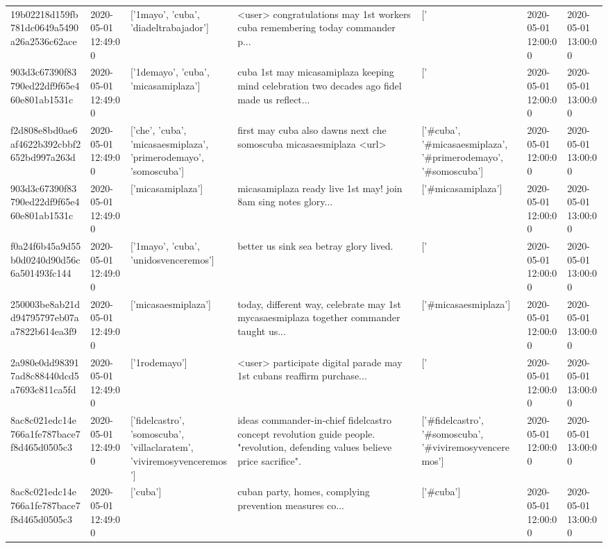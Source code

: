 \begin{tabular}{lllllll}
19b02218d159fb781dc0649a5490a26a2536c62ace & 2020-05-01 12:49:00 & ['1mayo', 'cuba', 'diadeltrabajador'] & <user> congratulations may 1st workers cuba remembering today commander p... & ['#1mayo', '#cuba', '#diadeltrabajador'] & 2020-05-01 12:00:00 & 2020-05-01 13:00:00 \\
903d3c67390f83790ed22df9f65e460e801ab1531c & 2020-05-01 12:49:00 & ['1demayo', 'cuba', 'micasamiplaza'] & cuba 1st may micasamiplaza keeping mind celebration two decades ago fidel made us reflect... & ['#1demayo', '#cuba', '#micasamiplaza'] & 2020-05-01 12:00:00 & 2020-05-01 13:00:00 \\
f2d808e8bd0ae6af4622b392cbbf2652bd997a263d & 2020-05-01 12:49:00 & ['che', 'cuba', 'micasaesmiplaza', 'primerodemayo', 'somoscuba'] & first may cuba also dawns next che somoscuba micasaesmiplaza <url> & ['#cuba', '#micasaesmiplaza', '#primerodemayo', '#somoscuba'] & 2020-05-01 12:00:00 & 2020-05-01 13:00:00 \\
903d3c67390f83790ed22df9f65e460e801ab1531c & 2020-05-01 12:49:00 & ['micasamiplaza'] & micasamiplaza ready live 1st may! join 8am sing notes glory... & ['#micasamiplaza'] & 2020-05-01 12:00:00 & 2020-05-01 13:00:00 \\
f0a24f6b45a9d55b0d0240d90d56c6a501493fc144 & 2020-05-01 12:49:00 & ['1mayo', 'cuba', 'unidosvenceremos'] & better us sink sea betray glory lived. & ['#1mayo', '#cuba', '#unidosvenceremos'] & 2020-05-01 12:00:00 & 2020-05-01 13:00:00 \\
250003be8ab21dd94795797eb07aa7822b614ea3f9 & 2020-05-01 12:49:00 & ['micasaesmiplaza'] & today, different way, celebrate may 1st mycasaesmiplaza together commander taught us... & ['#micasaesmiplaza'] & 2020-05-01 12:00:00 & 2020-05-01 13:00:00 \\
2a980e0dd983917ad8c88440dcd5a7693c811ca5fd & 2020-05-01 12:49:00 & ['1rodemayo'] & <user> participate digital parade may 1st cubans reaffirm purchase... & ['#1rodemayo'] & 2020-05-01 12:00:00 & 2020-05-01 13:00:00 \\
8ac8c021edc14e766a1fe787bace7f8d465d0505c3 & 2020-05-01 12:49:00 & ['fidelcastro', 'somoscuba', 'villaclaratem', 'viviremosyvenceremos'] & ideas commander-in-chief fidelcastro concept revolution guide people. "revolution, defending values believe price sacrifice". & ['#fidelcastro', '#somoscuba', '#viviremosyvenceremos'] & 2020-05-01 12:00:00 & 2020-05-01 13:00:00 \\
8ac8c021edc14e766a1fe787bace7f8d465d0505c3 & 2020-05-01 12:49:00 & ['cuba'] & cuban party, homes, complying prevention measures co... & ['#cuba'] & 2020-05-01 12:00:00 & 2020-05-01 13:00:00 \\

\end{tabular}
